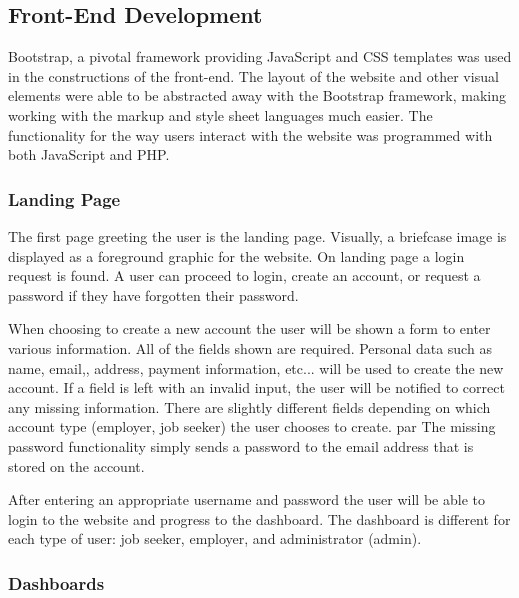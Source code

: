 \documentclass[11pt]{article}
\begin{document}
\subsection{Front-End Development}

Bootstrap, a pivotal framework providing JavaScript and CSS templates was used in the constructions of the front-end. The layout of the website and other visual elements were able to be abstracted away with the Bootstrap framework, making working with the markup and style sheet languages much easier. The functionality for the way users interact with the website was programmed with both JavaScript and PHP.

\subsubsection{Landing Page}

The first page greeting the user is the landing page. Visually, a briefcase image is displayed as a foreground graphic for the website. On landing page a login request is found. A user can proceed to login, create an account, or request a password if they have forgotten their password. \par
When choosing to create a new account the user will be shown a form to enter various information. All of the fields shown are required. Personal data such as name, email,, address, payment information, etc... will be used to create the new account. If a field is left with an invalid input, the user will be notified to correct any missing information. There are slightly different fields depending on which account type (employer, job seeker) the user chooses to create. par
The missing password functionality simply sends a password to the email address that is stored on the account. \par
After entering an appropriate username and password the user will be able to login to the website and progress to the dashboard. The dashboard is different for each type of user: job seeker, employer, and administrator (admin).

\subsubsection{Dashboards}
\end{document}
